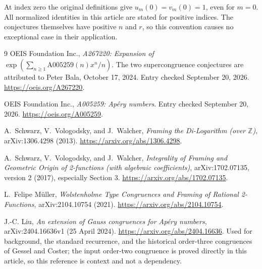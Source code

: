\documentclass[11pt,letterpaper]{article}
\numberwithin{equation}{section}
\theoremstyle{definition}
\newcommand{\Z}{\mathbb Z}
\begin{document}
At index zero the original definitions give $u_m(0)=v_m(0)=1$, even for
$m=0$. All normalized identities in this article are stated for positive
indices. The conjectures themselves have positive $n$ and $r$, so this
convention causes no exceptional case in their application.

\begin{thebibliography}{9}
OEIS Foundation Inc., \emph{A267220: Expansion of
$\exp(\sum_{n\geq1}\mathrm{A005259}(n)x^n/n)$}.
The two supercongruence conjectures are attributed to Peter Bala,
October 17, 2024. Entry checked September 20, 2026.
\url{https://oeis.org/A267220}.

OEIS Foundation Inc., \emph{A005259: Ap\'ery numbers}.
Entry checked September 20, 2026.
\url{https://oeis.org/A005259}.

A.~Schwarz, V.~Vologodsky, and J.~Walcher,
\emph{Framing the Di-Logarithm (over $\Z$)},
arXiv:1306.4298 (2013).
\url{https://arxiv.org/abs/1306.4298}.

A.~Schwarz, V.~Vologodsky, and J.~Walcher,
\emph{Integrality of Framing and Geometric Origin of 2-functions
(with algebraic coefficients)},
arXiv:1702.07135, version 2 (2017), especially Section 3.
\url{https://arxiv.org/abs/1702.07135}.

L.~Felipe M\"uller,
\emph{Wolstenholme Type Congruences and Framing of Rational 2-Functions},
arXiv:2104.10754 (2021).
\url{https://arxiv.org/abs/2104.10754}.

J.-C. Liu,
\emph{An extension of Gauss congruences for Ap\'ery numbers},
arXiv:2404.16636v1 (25 April 2024).
\url{https://arxiv.org/abs/2404.16636}.
Used for background, the standard recurrence, and the historical
order-three congruences of Gessel and Coster; the input order-two
congruence is proved directly in this article, so this reference is
context and not a dependency.
\end{thebibliography}
\end{document}

